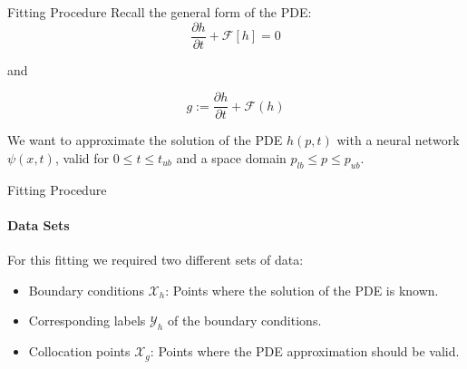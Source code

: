 \begin{frame}{Fitting Procedure}
    Recall the general form of the PDE:
    \begin{equation}
        \frac{\partial h}{\partial t} + \mathcal{F}[h] = 0
    \end{equation}

    and 

    \begin{equation}
        g := \frac{\partial h}{\partial t} + \mathcal{F}(h)
    \end{equation}

We want to approximate the solution of the PDE $h(p, t)$ with a neural network $\psi(x, t)$, valid for $0 \leq t \leq t_{ub}$ and a space domain $p_{lb} \leq p \leq p_{ub}$.
\end{frame}

\begin{frame}{Fitting Procedure}
\framesubtitle{Data Sets}

For this fitting we required two different sets of data:

\begin{itemize}
    \item Boundary conditions $\mathcal{X}_h$: Points where the solution of the PDE is known.
    \item Corresponding labels $\mathcal{Y}_h$ of the boundary conditions.
    \item Collocation points $\mathcal{X}_g$: Points where the PDE approximation should be valid.
\end{itemize}
\end{frame}

